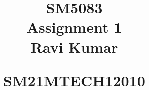 \documentclass[journal,12pt,twocolumn]{IEEEtran}
\begin{document}
%


\newtheorem{theorem}{Theorem}[section]
\newtheorem{problem}{Problem}
\newtheorem{proposition}{Proposition}[section]
\newtheorem{lemma}{Lemma}[section]
\newtheorem{corollary}[theorem]{Corollary}
\newtheorem{example}{Example}[section]
\newtheorem{definition}[problem]{Definition}
\newcommand{\BEQA}{\begin{eqnarray}}
\newcommand{\EEQA}{\end{eqnarray}}
\newcommand{\define}{\stackrel{\triangle}{=}}

\providecommand{\mbf}{\mathbf}
\providecommand{\pr}[1]{\ensuremath{\Pr\left(#1\right)}}
\providecommand{\qfunc}[1]{\ensuremath{Q\left(#1\right)}}
\providecommand{\sbrak}[1]{\ensuremath{{}\left[#1\right]}}
\providecommand{\lsbrak}[1]{\ensuremath{{}\left[#1\right.}}
\providecommand{\rsbrak}[1]{\ensuremath{{}\left.#1\right]}}
\providecommand{\brak}[1]{\ensuremath{\left(#1\right)}}
\providecommand{\lbrak}[1]{\ensuremath{\left(#1\right.}}
\providecommand{\rbrak}[1]{\ensuremath{\left.#1\right)}}
\providecommand{\cbrak}[1]{\ensuremath{\left\{#1\right\}}}
\providecommand{\lcbrak}[1]{\ensuremath{\left\{#1\right.}}
\providecommand{\rcbrak}[1]{\ensuremath{\left.#1\right\}}}
\theoremstyle{remark}
\newtheorem{rem}{Remark}
\newcommand{\sgn}{\mathop{\mathrm{sgn}}}
\providecommand{\abs}[1]{\lvert#1\rvert}
\providecommand{\res}[1]{\Res\displaylimits_{#1}} 
\providecommand{\norm}[1]{\lVert#1\rVert}
\providecommand{\mtx}[1]{\mathbf{#1}}
\providecommand{\fourier}{\overset{\mathcal{F}}{ \rightleftharpoons}}
\providecommand{\system}{\overset{\mathcal{H}}{ \longleftrightarrow}}
\newcommand{\solution}{\noindent \textbf{Solution: }}
\newcommand{\cosec}{\,\text{cosec}\,}
\providecommand{\dec}[2]{\ensuremath{\overset{#1}{\underset{#2}{\gtrless}}}}
\newcommand{\myvec}[1]{\ensuremath{\begin{pmatrix}#1\end{pmatrix}}}
\newcommand{\cmyvec}[1]{\ensuremath{\begin{pmatrix*}[c]#1\end{pmatrix*}}}
\newcommand{\mydet}[1]{\ensuremath{\begin{vmatrix}#1\end{vmatrix}}}
\newcommand{\proj}[2]{\textbf{proj}_{\vec{#1}}\vec{#2}}
\newcommand{\RNum}[1]{\uppercase\expandafter{\romannumeral #1\relax}}
\let\StandardTheFigure\thefigure
\let\vec\mathbf
\title{
\LARGE SM5083\\
    \LARGE Assignment 1 \\[0.5em]
    
    \large Ravi Kumar\par
    \large   SM21MTECH12010  \par
}
\maketitle
\renewcommand{\thefigure}{\theenumi}
\renewcommand{\thetable}{\theenumi}
\end{document}
